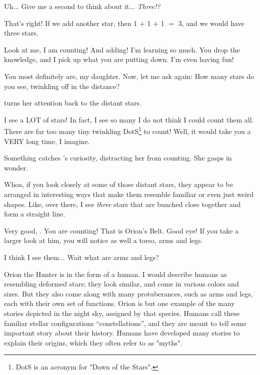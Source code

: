 \documentclass[main.tex]{subfiles}
\begin{document}
\par \Maia Uh... Give me a second to think about it... \textit{Three!?}

\par \Pleione That's right!  If we add another star, then 1 $+$ 1 $+$ 1 $=$ 3, and we would have three stars.  

\par \Maia Look at me, I am counting!  And adding!  I'm learning so much.  You drop the knowledge, and I pick up what you are putting down.  I'm even having fun!

\par \Pleione You most definitely are, my daughter.  Now, let me ask again:  How many stars do you see, twinkling off in the distance?

\par \nar \rmmaia turns her attention back to the distant stars.  

\par \Maia I see a LOT of stars!  In fact, I see so many I do not think I could count them all.  There are far too many tiny twinkling DotS\footnote{DotS is an acronym for "Dawn of the Stars".} to count!  Well, it would take you a VERY long time, I imagine.

\par \nar Something catches \rmmaia's curiosity, distracting her from counting.  She gasps in wonder.

\par \Maia Whoa, if you look closely at some of those distant stars, they appear to be arranged in interesting ways that make them resemble familiar or even just weird shapes.  Like, over there, I see \textit{three} stars that are bunched close together and form a straight line.

\par \Pleione Very good, \rmmaia.  You are counting!  That is Orion's Belt.  Good eye!  If you take a larger look at him, you will notice as well a torso, arms and legs.  

\par \Maia I think I see them... Wait what are arms and legs?  

\par \Pleione Orion the Hunter is in the form of a human.  I would describe humans as resembling deformed stars; they look similar, and come in various colors and sizes.  But they also come along with many protuberances, such as arms and legs, each with their own set of functions.   Orion is but one example of the many stories depicted in the night sky, assigned by that species.  Humans call these familiar stellar configurations ``constellations'', and they are meant to tell some important story about their history.  Humans have developed many stories to explain their origins, which they often refer to as "myths".
\end{document}
